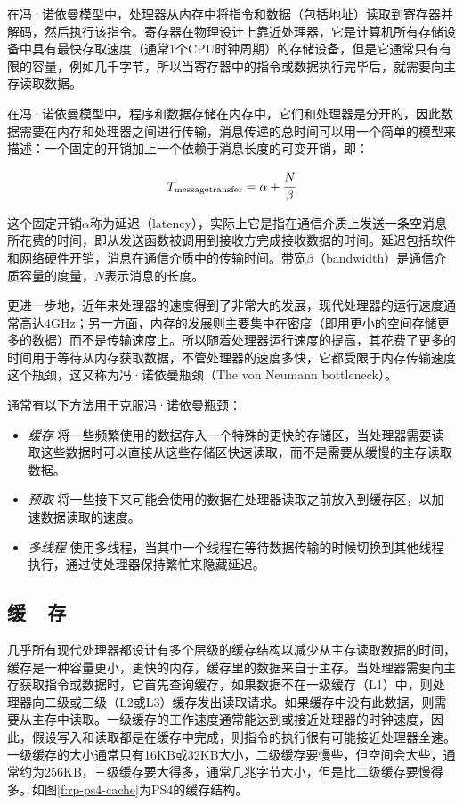 在冯·诺依曼模型中，处理器从内存中将指令和数据（包括地址）读取到寄存器并解码，然后执行该指令。寄存器在物理设计上靠近处理器，它是计算机所有存储设备中具有最快存取速度（通常1个CPU时钟周期）的存储设备，但是它通常只有有限的容量，例如几千字节，所以当寄存器中的指令或数据执行完毕后，就需要向主存读取数据。

在冯·诺依曼模型中，程序和数据存储在内存中，它们和处理器是分开的，因此数据需要在内存和处理器之间进行传输，消息传递的总时间可以用一个简单的模型来描述：一个固定的开销加上一个依赖于消息长度的可变开销，即：

\begin{equation}
	T_{\rm message transfer}=\alpha+ \cfrac{N}{\beta}
\end{equation}


\noindent 这个固定开销$\alpha$称为延迟（latency），实际上它是指在通信介质上发送一条空消息所花费的时间，即从发送函数被调用到接收方完成接收数据的时间。延迟包括软件和网络硬件开销，消息在通信介质中的传输时间。带宽$\beta$（bandwidth）是通信介质容量的度量，$N$表示消息的长度。

更进一步地，近年来处理器的速度得到了非常大的发展，现代处理器的运行速度通常高达4GHz；另一方面，内存的发展则主要集中在密度（即用更小的空间存储更多的数据）而不是传输速度上。所以随着处理器运行速度的提高，其花费了更多的时间用于等待从内存获取数据，不管处理器的速度多快，它都受限于内存传输速度这个瓶颈，这又称为冯·诺依曼瓶颈（The von Neumann bottleneck）。

通常有以下方法用于克服冯·诺依曼瓶颈：

\begin{itemize}
	\item \emph{缓存 } 将一些频繁使用的数据存入一个特殊的更快的存储区，当处理器需要读取这些数据时可以直接从这些存储区快速读取，而不是需要从缓慢的主存读取数据。
	\item \emph{预取 } 将一些接下来可能会使用的数据在处理器读取之前放入到缓存区，以加速数据读取的速度。
	\item \emph{多线程 } 使用多线程，当其中一个线程在等待数据传输的时候切换到其他线程执行，通过使处理器保持繁忙来隐藏延迟。
\end{itemize}




\subsection{缓~~存}
几乎所有现代处理器都设计有多个层级的缓存结构以减少从主存读取数据的时间，缓存是一种容量更小，更快的内存，缓存里的数据来自于主存。当处理器需要向主存获取指令或数据时，它首先查询缓存，如果数据不在一级缓存（L1）中，则处理器向二级或三级（L2或L3）缓存发出读取请求。如果缓存中没有此数据，则需要从主存中读取。一级缓存的工作速度通常能达到或接近处理器的时钟速度，因此，假设写入和读取都是在缓存中完成，则指令的执行很有可能接近处理器全速。一级缓存的大小通常只有16KB或32KB大小，二级缓存要慢些，但空间会大些，通常约为256KB，三级缓存要大得多，通常几兆字节大小，但是比二级缓存要慢得多。如图\ref{f:rp-ps4-cache}为PS4的缓存结构。

